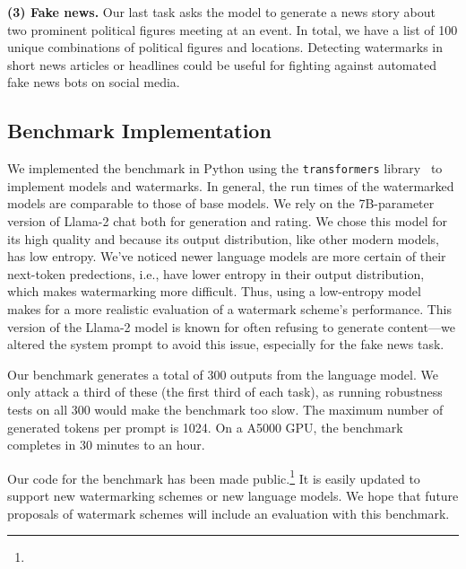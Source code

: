 \smallskip\noindent\textbf{(3) Fake news.}
%
Our last task asks the model to generate a news story about two prominent political figures meeting at an event.
%
In total, we have a list of 100 unique combinations of political figures and locations.
%
Detecting watermarks in short news articles or headlines could be useful for fighting against automated fake news bots on social media.
%

\subsection{Benchmark Implementation}

We implemented the \benchmarkname{} benchmark in Python using the \texttt{transformers} library~\citep{wolf_transformers_2020} to implement models and watermarks.
%
In general, the run times of the watermarked models are comparable to those of base models.
%
We rely on the 7B-parameter version of Llama-2 chat both for generation and rating.
%
We chose this model for its high quality and because its output distribution, like other modern models, has low entropy.
We've noticed newer language models are more certain of their next-token predections, i.e., have lower entropy in their output distribution,
which makes watermarking more difficult. Thus, using a low-entropy model makes for a more realistic 
evaluation of a watermark scheme's performance. 
%
This version of the Llama-2 model is known for often refusing to generate content---we 
altered the system prompt to avoid this issue, especially for the fake news task.

Our benchmark generates a total of 300 outputs from the language model.
%
We only attack a third of these (the first third of each task),
as running robustness tests on all 300 would make the benchmark too slow.
%
The maximum number of generated tokens per prompt is 1024.
%
On a A5000 GPU, the benchmark completes in 30 minutes to an hour. 

%

Our code for the \benchmarkname{} benchmark has been made public.\footnote{}
%
It is easily updated to support new watermarking schemes or new language models.
%
We hope that future proposals of watermark schemes will include an evaluation with this benchmark.

